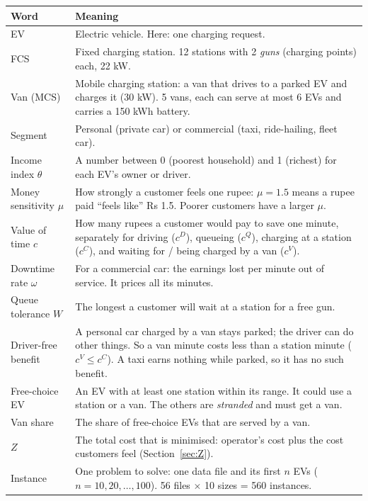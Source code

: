 {\small
\begin{longtable}{@{}>{\raggedright\arraybackslash}p{3.6cm}>{\raggedright\arraybackslash}p{12.6cm}@{}}
\toprule
\textbf{Word} & \textbf{Meaning} \\
\midrule
\endhead
EV & Electric vehicle. Here: one charging request. \\
FCS & Fixed charging station. 12 stations with 2 \emph{guns} (charging points) each, 22 kW. \\
Van (MCS) & Mobile charging station: a van that drives to a parked EV and charges it (30 kW). 5 vans, each can serve at most 6 EVs and carries a 150 kWh battery. \\
Segment & Personal (private car) or commercial (taxi, ride-hailing, fleet car). \\
Income index $\theta$ & A number between 0 (poorest household) and 1 (richest) for each EV's owner or driver. \\
Money sensitivity $\mu$ & How strongly a customer feels one rupee: $\mu=1.5$ means a rupee paid ``feels like'' Rs 1.5. Poorer customers have a larger $\mu$. \\
Value of time $c$ & How many rupees a customer would pay to save one minute, separately for driving ($c^D$), queueing ($c^Q$), charging at a station ($c^C$), and waiting for / being charged by a van ($c^V$). \\
Downtime rate $\omega$ & For a commercial car: the earnings lost per minute out of service. It prices all its minutes. \\
Queue tolerance $W$ & The longest a customer will wait at a station for a free gun. \\
Driver-free benefit & A personal car charged by a van stays parked; the driver can do other things. So a van minute costs less than a station minute ($c^V\le c^C$). A taxi earns nothing while parked, so it has no such benefit. \\
Free-choice EV & An EV with at least one station within its range. It could use a station or a van. The others are \emph{stranded} and must get a van. \\
Van share & The share of free-choice EVs that are served by a van. \\
$Z$ & The total cost that is minimised: operator's cost plus the cost customers feel (Section~\ref{sec:Z}). \\
Instance & One problem to solve: one data file and its first $n$ EVs ($n=10,20,\dots,100$). 56 files $\times$ 10 sizes = 560 instances. \\

\end{longtable}}
